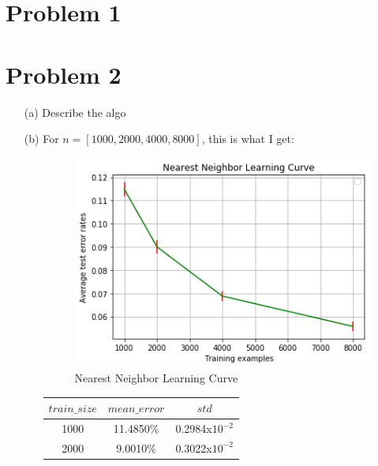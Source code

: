 \documentclass[twoside]{homework}
\begin{document}
\maketitle

\section*{Problem 1}

\section*{Problem 2}

\begin{itemize}
    \item [(a)] Describe the algo
    \item [(b)] For $n=[1000, 2000, 4000, 8000]$, this is what I get:
        \begin{itemize}
            \item[]
            \begin{figure}[h!]
                \centering
                \includegraphics[scale=1]{nn_learning_curve}
                \caption{Nearest Neighbor Learning Curve}
                \label{fig:universe}
            \end{figure}
            \item[]
            \begin{table}[h!]
                \centering
                \begin{tabular}{||c c c||} 
                    \hline
                    $train\_size$ & $mean\_error$ & $std$ \\ [0.5ex] 
                    \hline\hline
                    1000 & 11.4850\% & 0.2984x$10^{-2}$ \\ 
                    \hline
                    2000 & 9.0010\% & 0.3022x$10^{-2}$ \\

\end{tabular}
\end{table}
\end{itemize}
\end{itemize}
\end{document}
